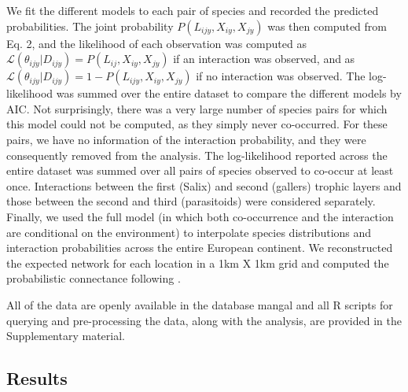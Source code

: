 \documentclass[12pt]{article}
\begin{document}
We fit the different models to each pair of species and recorded the 
predicted probabilities. The joint probability $P(L_{ijy},X_{iy},X_{jy})$
was then computed from Eq. 2, and the likelihood of each observation was
computed as $\mathcal{L}(\theta_{ijy}|D_{ijy})=P(L_{ij},X_{iy},X_{jy})$ if an
interaction was observed, and as
$\mathcal{L}(\theta_{ijy}|D_{ijy})=1-P(L_{ijy},X_{iy},X_{jy})$ if no
interaction was observed. The log-likelihood was summed over the entire
dataset to compare the different models by AIC. Not surprisingly, there was a
very large number of species pairs for which this model could not be computed,
as they simply never co-occurred. For these pairs, we have no information of
the interaction probability, and they were consequently removed from the
analysis. The log-likelihood reported across the entire dataset was summed
over all pairs of species observed to co-occur at least once. Interactions
between the first (Salix) and second (gallers) trophic layers and those
between the second and third (parasitoids) were considered separately.
Finally, we used the full model (in which both co-occurrence and the
interaction are conditional on the environment) to interpolate species
distributions and interaction probabilities across the entire European
continent. We reconstructed the expected network for each location in a 1km X
1km grid and computed the probabilistic connectance following
\citep{Poisot2015b}.  

All of the data are openly available in the database mangal \citep{Poisot2015c} and
all R scripts for querying and pre-processing the data, along with the
analysis, are provided in the Supplementary material.

\subsection*{Results}  
\end{document}

